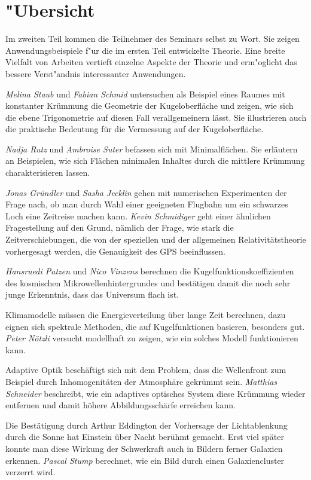 %
%
%
\chapter*{"Ubersicht}
\rhead{}
\label{skript:uebersicht}
Im zweiten Teil kommen die Teilnehmer des Seminars selbst zu Wort.
Sie zeigen Anwendungsbeispiele f"ur die im ersten
Teil entwickelte Theorie.
Eine breite Vielfalt von Arbeiten vertieft einzelne Aspekte der Theorie
und erm"oglicht das bessere Verst"andnis interessanter Anwendungen.

{\em Melina Staub} und {\em Fabian Schmid} untersuchen als Beispiel
eines Raumes mit konstanter Krümmung die Geometrie der Kugeloberfläche
und zeigen, wie sich die ebene Trigonometrie auf diesen Fall verallgemeinern
lässt.
Sie illustrieren auch die praktische Bedeutung für die Vermessung auf
der Kugeloberfläche.

{\em Nadja Rutz} und {\em Ambroise Suter} befassen sich mit Minimalflächen.
Sie erläutern an Beispielen, wie sich Flächen minimalen Inhaltes durch
die mittlere Krümmung charakterisieren lassen.

{\em Jonas Gründler} und {\em Sasha Jecklin} gehen mit numerischen
Experimenten der Frage nach, ob man durch Wahl einer geeigneten
Flugbahn um ein schwarzes Loch eine Zeitreise machen kann.
{\em Kevin Schmidiger} geht einer ähnlichen Fragestellung auf den Grund,
nämlich der Frage, wie stark die Zeitverschiebungen, die von der
speziellen und der allgemeinen Relativitätstheorie vorhergesagt werden,
die Genauigkeit des GPS beeinflussen.

{\em Hansruedi Patzen} und {\em Nico Vinzens} berechnen
die Kugelfunktionskoeffizienten des kosmischen Mikrowellenhintergrundes
und bestätigen damit die noch sehr junge Erkenntnis, dass das
Universum flach ist.

Klimamodelle müssen die Energieverteilung über lange Zeit berechnen,
dazu eignen sich spektrale Methoden, die auf Kugelfunktionen basieren,
besonders gut. {\em Peter Nötzli} versucht modellhaft zu zeigen, wie
ein solches Modell funktionieren kann.

Adaptive Optik beschäftigt sich mit dem Problem, dass die Wellenfront
zum Beispiel durch Inhomogenitäten der Atmosphäre gekrümmt sein.
{\em Matthias Schneider} beschreibt, wie ein adaptives optisches 
System diese Krümmung wieder entfernen und damit höhere Abbildungsschärfe
erreichen kann.

Die Bestätigung durch Arthur Eddington der Vorhersage der Lichtablenkung
durch die Sonne hat Einstein über Nacht berühmt gemacht.
Erst viel später konnte man diese Wirkung der Schwerkraft auch in
Bildern ferner Galaxien erkennen.
{\em Pascal Stump} berechnet, wie ein Bild durch einen Galaxiencluster
verzerrt wird.

